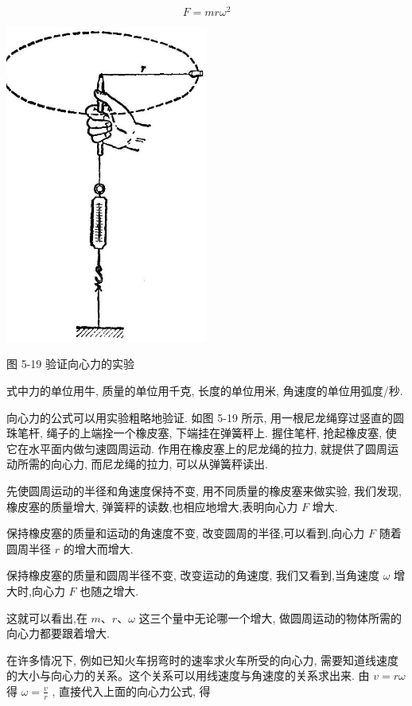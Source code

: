 \documentclass[10pt]{article}
\begin{document}
\[
F = {mr}{\omega }^{2}
\]

\begin{center}
\includegraphics[max width=0.5\textwidth]{images/01912d55-147c-70aa-b0e0-1782a122f948_144_506913.jpg}
\end{center}

图 5-19 验证向心力的实验

式中力的单位用牛, 质量的单位用千克, 长度的单位用米, 角速度的单位用弧度/秒.

向心力的公式可以用实验粗略地验证. 如图 5-19 所示, 用一根尼龙绳穿过竖直的圆珠笔杆, 绳子的上端拴一个橡皮塞, 下端挂在弹簧秤上. 握住笔杆, 抢起橡皮塞, 使它在水平面内做匀速圆周运动. 作用在橡皮塞上的尼龙绳的拉力, 就提供了圆周运动所需的向心力, 而尼龙绳的拉力, 可以从弹簧秤读出.

先使圆周运动的半径和角速度保持不变, 用不同质量的橡皮塞来做实验, 我们发现, 橡皮塞的质量增大, 弹簧秤的读数,也相应地增大,表明向心力 \(F\) 增大.

保持橡皮塞的质量和运动的角速度不变, 改变圆周的半径,可以看到,向心力 \(F\) 随着圆周半径 \(r\) 的增大而增大.

保持橡皮塞的质量和圆周半径不变, 改变运动的角速度, 我们又看到,当角速度 \(\omega\) 增大时,向心力 \(F\) 也随之增大.

这就可以看出,在 \(m\text{、}r\text{、}\omega\) 这三个量中无论哪一个增大, 做圆周运动的物体所需的向心力都要跟着增大.

在许多情况下, 例如已知火车拐弯时的速率求火车所受的向心力, 需要知道线速度的大小与向心力的关系。这个关系可以用线速度与角速度的关系求出来. 由 \(v = {r\omega }\) 得 \(\omega = \frac{v}{r}\) , 直接代入上面的向心力公式, 得
\end{document}
